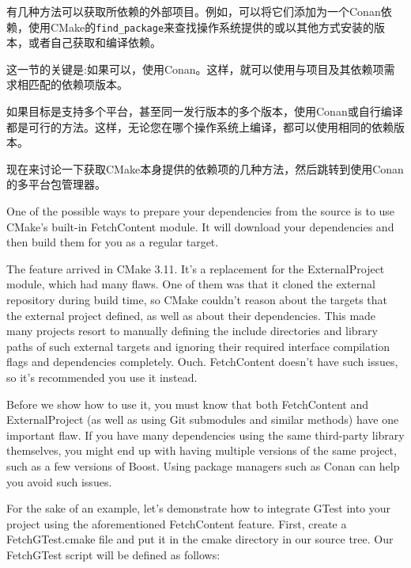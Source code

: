 
有几种方法可以获取所依赖的外部项目。例如，可以将它们添加为一个Conan依赖，使用CMake的\texttt{find\_package}来查找操作系统提供的或以其他方式安装的版本，或者自己获取和编译依赖。

这一节的关键是:如果可以，使用Conan。这样，就可以使用与项目及其依赖项需求相匹配的依赖项版本。

如果目标是支持多个平台，甚至同一发行版本的多个版本，使用Conan或自行编译都是可行的方法。这样，无论您在哪个操作系统上编译，都可以使用相同的依赖版本。

现在来讨论一下获取CMake本身提供的依赖项的几种方法，然后跳转到使用Conan的多平台包管理器。


One of the possible ways to prepare your dependencies from the source is to use CMake's built-in FetchContent module. It will download your dependencies and then build them for you as a regular target.

The feature arrived in CMake 3.11. It's a replacement for the ExternalProject module, which had many flaws. One of them was that it cloned the external repository during build time, so CMake couldn't reason about the targets that the external project defined, as well as about their dependencies. This made many projects resort to manually defining the include directories and library paths of such external targets and ignoring their required  interface compilation flags and dependencies completely. Ouch. FetchContent doesn't have such issues, so it's recommended you use it instead.

\begin{tcolorbox}[colback=blue!5!white,colframe=blue!75!black, title=Note]
\hspace*{0.7cm}Before we show how to use it, you must know that both FetchContent and ExternalProject (as well as using Git submodules and similar methods) have one important flaw. If you have many dependencies using the same third-party library themselves, you might end up with having multiple versions of the same project, such as a few versions of Boost. Using package managers such as Conan can help you avoid such issues.
\end{tcolorbox}

For the sake of an example, let's demonstrate how to integrate GTest into your project using the aforementioned FetchContent feature. First, create a FetchGTest.cmake file and put it in the cmake directory in our source tree. Our FetchGTest script will be defined as follows:

